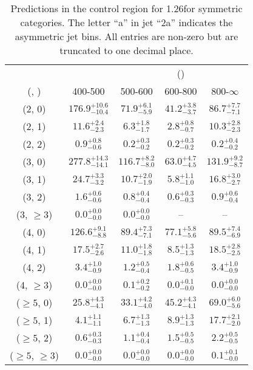 \begin{table}[h!]
\tiny
\centering
\caption{Predictions in the \gj control region for 1.26\ifb for symmetric categories. The letter ``a'' in jet \eg ``2a''  indicates the asymmetric jet bins. All entries are non-zero but are truncated to one decimal place.\label{tab:predsep_ewk_gj_sym}}
\begin{tabular}
{ccccc}
	\hline\hline
&	& \multicolumn{4}{c}{\scalht (\gev)} \\ 
	 (\njet,  \nb) & 400-500 & 500-600 & 600-800 & 800-$\infty$ \\ [0.8ex] 
\hline
	(2, 0) & $176.9^{+ 10.6 }_{- 10.4 }$ & $71.9^{+ 6.1 }_{- 5.9 }$ & $41.2^{+ 3.8 }_{- 3.7 }$ & $86.7^{+ 7.7 }_{- 7.1 }$ \\[0.5ex] 
	(2, 1) & $11.6^{+ 2.4 }_{- 2.3 }$ & $6.3^{+ 1.8 }_{- 1.7 }$ & $2.8^{+ 0.8 }_{- 0.7 }$ & $10.3^{+ 2.8 }_{- 2.3 }$ \\[0.5ex] 
	(2, 2) & $0.9^{+ 0.8 }_{- 0.6 }$ & $0.2^{+ 0.3 }_{- 0.2 }$ & $0.2^{+ 0.3 }_{- 0.2 }$ & $0.2^{+ 0.4 }_{- 0.2 }$ \\[0.5ex] 
	(3, 0) & $277.8^{+ 14.3 }_{- 14.1 }$ & $116.7^{+ 8.2 }_{- 8.0 }$ & $63.0^{+ 4.7 }_{- 4.5 }$ & $131.9^{+ 9.2 }_{- 8.7 }$ \\[0.5ex] 
	(3, 1) & $24.7^{+ 3.3 }_{- 3.2 }$ & $10.7^{+ 2.0 }_{- 1.9 }$ & $5.8^{+ 1.1 }_{- 1.0 }$ & $16.8^{+ 3.0 }_{- 2.7 }$ \\[0.5ex] 
	(3, 2) & $1.6^{+ 0.6 }_{- 0.6 }$ & $0.8^{+ 0.4 }_{- 0.4 }$ & $0.6^{+ 0.3 }_{- 0.3 }$ & $0.9^{+ 0.6 }_{- 0.4 }$ \\[0.5ex] 
	(3, $\ge3$) & $0.0^{+ 0.0 }_{- 0.0 }$ & $0.0^{+ 0.0 }_{- 0.0 }$ & -- & -- \\[0.5ex] 
	(4, 0) & $126.6^{+ 9.1 }_{- 8.8 }$ & $89.4^{+ 7.3 }_{- 7.1 }$ & $77.1^{+ 5.8 }_{- 5.6 }$ & $89.5^{+ 7.4 }_{- 6.9 }$ \\[0.5ex] 
	(4, 1) & $17.5^{+ 2.7 }_{- 2.6 }$ & $11.0^{+ 1.8 }_{- 1.8 }$ & $8.5^{+ 1.3 }_{- 1.3 }$ & $18.5^{+ 2.8 }_{- 2.5 }$ \\[0.5ex] 
	(4, 2) & $3.4^{+ 1.0 }_{- 0.9 }$ & $1.2^{+ 0.5 }_{- 0.4 }$ & $1.8^{+ 0.6 }_{- 0.5 }$ & $3.4^{+ 1.0 }_{- 0.9 }$ \\[0.5ex] 
	(4, $\ge3$) & $0.0^{+ 0.0 }_{- 0.0 }$ & $0.1^{+ 0.2 }_{- 0.2 }$ & $0.0^{+ 0.1 }_{- 0.0 }$ & $0.0^{+ 0.0 }_{- 0.0 }$ \\[0.5ex] 
	($\ge5$, 0) & $25.8^{+ 4.3 }_{- 4.1 }$ & $33.1^{+ 4.2 }_{- 4.0 }$ & $45.2^{+ 4.3 }_{- 4.1 }$ & $69.0^{+ 6.0 }_{- 5.6 }$ \\[0.5ex] 
	($\ge5$, 1) & $4.1^{+ 1.1 }_{- 1.1 }$ & $6.7^{+ 1.3 }_{- 1.3 }$ & $8.9^{+ 1.3 }_{- 1.3 }$ & $17.7^{+ 2.1 }_{- 2.0 }$ \\[0.5ex] 
	($\ge5$, 2) & $0.6^{+ 0.3 }_{- 0.3 }$ & $1.1^{+ 0.4 }_{- 0.4 }$ & $1.5^{+ 0.5 }_{- 0.5 }$ & $2.2^{+ 0.5 }_{- 0.5 }$ \\[0.5ex] 
	($\ge5$, $\ge3$) & $0.0^{+ 0.0 }_{- 0.0 }$ & $0.0^{+ 0.0 }_{- 0.0 }$ & $0.0^{+ 0.0 }_{- 0.0 }$ & $0.1^{+ 0.1 }_{- 0.0 }$ \\[0.5ex] 
	\hline
	\hline
\end{tabular}
\end{table}
